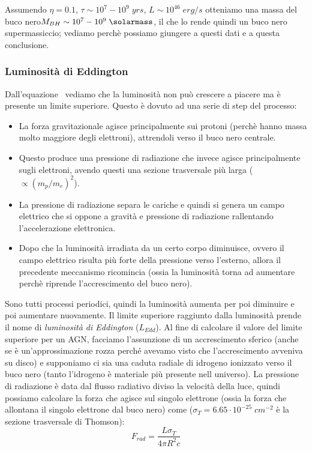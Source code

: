 Assumendo $\eta = 0.1$, $\tau \sim 10^7-10^9 \;\si{yrs}$, $L \sim 10^{46} \;\si{erg}/\si{s}$ otteniamo una massa del buco nero$M_{BH} \sim 10^7-10^9 \;\si{\solarmass}$, il che lo rende quindi un buco nero supermassiccio; vediamo perchè possiamo giungere a questi dati e a questa conclusione.

\subsubsection{Luminosità di Eddington}
Dall'equazione~ vediamo che la luminosità non può crescere a piacere ma è presente un limite superiore. Questo è dovuto ad una serie di step del processo:
\begin{itemize}
    \item La forza gravitazionale agisce principalmente sui protoni (perchè hanno massa molto maggiore degli elettroni), attrendoli verso il buco nero centrale.
    \item Questo produce una pressione di radiazione che invece agisce principalmente sugli elettroni, avendo questi una sezione trasversale più larga ($\propto (m_p/m_e)^2$).
    \item La pressione di radiazione separa le cariche e quindi si genera un campo elettrico che si oppone a gravità e pressione di radiazione rallentando l'accelerazione elettronica.
    \item Dopo che la luminosità irradiata da un certo corpo diminuisce, ovvero il campo elettrico risulta più forte della pressione verso l'esterno, allora il precedente meccanismo ricomincia (ossia la luminosità torna ad aumentare perchè riprende l'accrescimento del buco nero).
\end{itemize}
Sono tutti processi periodici, quindi la luminosità aumenta per poi diminuire e poi aumentare nuovamente. Il limite superiore raggiunto dalla luminosità prende il nome di \emph{luminosità di Eddington} ($L_{Edd}$). Al fine di calcolare il valore del limite superiore per un AGN, facciamo l'assunzione di un accrescimento sferico (anche se è un’approssimazione rozza perché avevamo visto che l’accrescimento avveniva su disco) e supponiamo ci sia una caduta radiale di idrogeno ionizzato verso il buco nero (tanto l'idrogeno è materiale più presente nell universo). La pressione di radiazione è data dal flusso radiativo diviso la velocità della luce, quindi possiamo calcolare la forza che agisce sul singolo elettrone (ossia la forza che allontana il singolo elettrone dal buco nero) come ($\sigma_T = 6.65 \cdot 10^{-25} \;\si{cm^{-2}}$ è la sezione trasversale di Thomson):
\begin{equation*}
    F_{rad} = \frac{L\sigma_T}{4\pi R^2 c}
\end{equation*}

